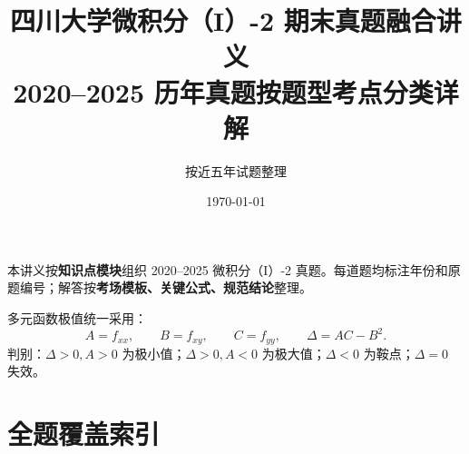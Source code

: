 ﻿\documentclass[11pt,a4paper,UTF8]{ctexart}
\title{\Huge 四川大学微积分（I）-2 期末真题融合讲义\\[0.25em]
\Large 2020--2025 历年真题按题型考点分类详解}
\author{按近五年试题整理}
\date{\today}
\begin{document}
\maketitle
\thispagestyle{empty}

\begin{scorebox}[定位]
本讲义按\textbf{知识点模块}组织 2020--2025 微积分（I）-2 真题。每道题均标注年份和原题编号；解答按\textbf{考场模板、关键公式、规范结论}整理。

多元函数极值统一采用：
\[
A=f_{xx},\qquad B=f_{xy},\qquad C=f_{yy},\qquad \Delta=AC-B^2.
\]
判别：$\Delta>0,A>0$ 为极小值；$\Delta>0,A<0$ 为极大值；$\Delta<0$ 为鞍点；$\Delta=0$ 失效。
\end{scorebox}

\tableofcontents
\newpage

\section{全题覆盖索引}
\end{document}
